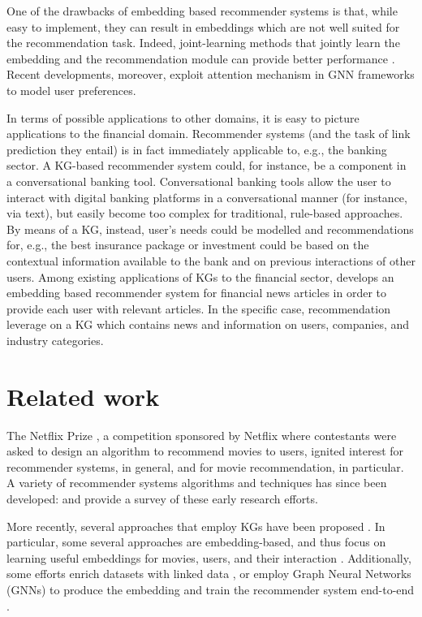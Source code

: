 One of the drawbacks of embedding based recommender systems is that, while easy to implement, they can result in embeddings which are not well suited for the recommendation task.
Indeed, joint-learning methods that jointly learn the embedding and the recommendation module can provide better performance \parencite{guo2020survey}.
Recent developments, moreover, exploit attention mechanism in GNN frameworks to model user preferences. 

In terms of possible applications to other domains, it is easy to picture applications to the financial domain.
Recommender systems (and the task of link prediction they entail) is in fact immediately applicable to, e.g., the banking sector.
A KG-based recommender system could, for instance, be a component in a conversational banking tool.
Conversational banking tools allow the user to interact with digital banking platforms in a conversational manner (for instance, via text), but easily become too complex for traditional, rule-based approaches.
By means of a KG, instead, user's needs could be modelled and recommendations for, e.g., the best insurance package or investment could be based on the contextual information available to the bank and on previous interactions of other users. 
Among existing applications of KGs to the financial sector, \cite{ren2019financial} develops an embedding based recommender system for financial news articles in order to provide each user with relevant articles.
In the specific case, recommendation leverage on a KG which contains news and information on users, companies, and industry categories.




\section{Related work}\label{sec:reated}

The Netflix Prize \parencite{bennett2007netflix}, a competition sponsored by Netflix where contestants were asked to design an algorithm to recommend movies to users, ignited interest for recommender systems, in general, and for movie recommendation, in particular.
A variety of recommender systems algorithms and techniques has since been developed: \cite{schafer2007collaborative} and \cite{bobadilla2013recommender} provide a survey of these early research efforts.

More recently, several approaches that employ KGs have been proposed \parencite{grad2015recommendations, guo2020survey}.
In particular, some several approaches are embedding-based, and thus focus on learning useful embeddings for movies, users, and their interaction \parencite{palumbo2017entity2rec, zhang2018learning}.
Additionally, some efforts enrich datasets with linked data \parencite{ostuni2013top}, or employ Graph Neural Networks (GNNs) to produce the embedding and train the recommender system end-to-end \parencite{wang2019knowledge}.



